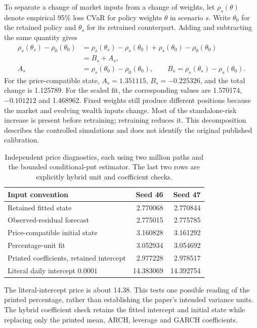 \documentclass[11pt,a4paper]{article}
\theoremstyle{remark}
\begin{document}
To separate a change of market inputs from a change of weights, let $\rho_s(\theta)$ denote empirical 95\% loss CVaR for policy weights $\theta$ in scenario $s$. Write $\theta_0$ for the retained policy and $\theta_s$ for its retrained counterpart. Adding and subtracting the same quantity gives
\begin{align}
 \rho_s(\theta_s)-\rho_0(\theta_0)
 &=\rho_s(\theta_s)-\rho_s(\theta_0)
   +\rho_s(\theta_0)-\rho_0(\theta_0)\nonumber\\
 &=B_s+A_s,\nonumber\\
 A_s&=\rho_s(\theta_0)-\rho_0(\theta_0),\qquad
 B_s=\rho_s(\theta_s)-\rho_s(\theta_0).
\end{align}
For the price-compatible state, $A_s=1.351115$, $B_s=-0.225326$, and the total change is 1.125789. For the scaled fit, the corresponding values are 1.570174, $-0.101212$ and 1.468962. Fixed weights still produce different positions because the market and evolving wealth inputs change. Most of the standalone-risk increase is present before retraining; retraining reduces it. This decomposition describes the controlled simulations and does not identify the original published calibration.

\begin{table}[htbp]
\centering\small
\caption{Independent price diagnostics, each using two million paths and the bounded conditional-put estimator. The last two rows are explicitly hybrid unit and coefficient checks.}
\begin{tabular}{@{}lrr@{}}
\toprule
Input convention & Seed 46 & Seed 47\\
\midrule
Retained fitted state & 2.770068 & 2.770844\\
Observed-residual forecast & 2.775015 & 2.775785\\
Price-compatible initial state & 3.160828 & 3.161292\\
Percentage-unit fit & 3.052934 & 3.054692\\
Printed coefficients, retained intercept & 2.977228 & 2.978517\\
Literal daily intercept $0.0001$ & 14.383069 & 14.392754\\
\bottomrule
\end{tabular}
\end{table}
The literal-intercept price is about 14.38. This tests one possible reading of the printed percentage, rather than establishing the paper's intended variance units. The hybrid coefficient check retains the fitted intercept and initial state while replacing only the printed mean, ARCH, leverage and GARCH coefficients.
\end{document}
